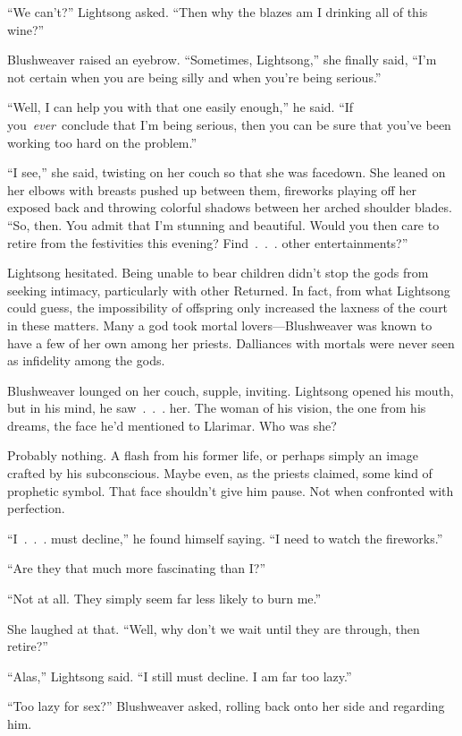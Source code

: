 “We can’t?” Lightsong asked. “Then why the blazes am I drinking all of this wine?”

Blushweaver raised an eyebrow. “Sometimes, Lightsong,” she finally said, “I’m not certain when you are being silly and when you’re being serious.”

“Well, I can help you with that one easily enough,” he said. “If you~\textit{ever}~conclude that I’m being serious, then you can be sure that you’ve been working too hard on the problem.”

“I see,” she said, twisting on her couch so that she was facedown. She leaned on her elbows with breasts pushed up between them, fireworks playing off her exposed back and throwing colorful shadows between her arched shoulder blades. “So, then. You admit that I’m stunning and beautiful. Would you then care to retire from the festivities this evening? Find~.~.~. other entertainments?”

Lightsong hesitated. Being unable to bear children didn’t stop the gods from seeking intimacy, particularly with other Returned. In fact, from what Lightsong could guess, the impossibility of offspring only increased the laxness of the court in these matters. Many a god took mortal lovers—Blushweaver was known to have a few of her own among her priests. Dalliances with mortals were never seen as infidelity among the gods.

Blushweaver lounged on her couch, supple, inviting. Lightsong opened his mouth, but in his mind, he saw~.~.~. her. The woman of his vision, the one from his dreams, the face he’d mentioned to Llarimar. Who was she?

Probably nothing. A flash from his former life, or perhaps simply an image crafted by his subconscious. Maybe even, as the priests claimed, some kind of prophetic symbol. That face shouldn’t give him pause. Not when confronted with perfection.

“I~.~.~. must decline,” he found himself saying. “I need to watch the fireworks.”

“Are they that much more fascinating than I?”

“Not at all. They simply seem far less likely to burn me.”

She laughed at that. “Well, why don’t we wait until they are through, then retire?”

“Alas,” Lightsong said. “I still must decline. I am far too lazy.”

“Too lazy for sex?” Blushweaver asked, rolling back onto her side and regarding him.

